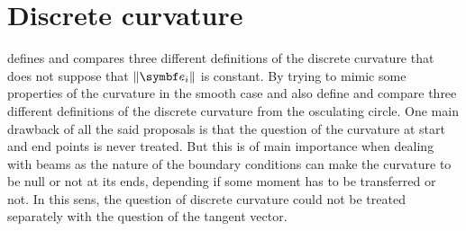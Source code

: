 \section{Discrete curvature}\label{sec=discrete_curvature}
 defines and compares three different definitions of the discrete curvature that does not suppose that $\norm{\vect{e}_i}$ is constant. By trying to mimic some properties of the curvature in the smooth case  and  also define and compare three different definitions of the discrete curvature from the osculating circle. One main drawback of all the said proposals is that the question of the curvature at  start and end points is never treated. But this is of main importance when dealing with beams as the nature of the boundary conditions can make the curvature to be null or not at its ends, depending if some moment has to be transferred or not. In this sens, the question of discrete curvature could not be treated separately with the question of the tangent vector.


